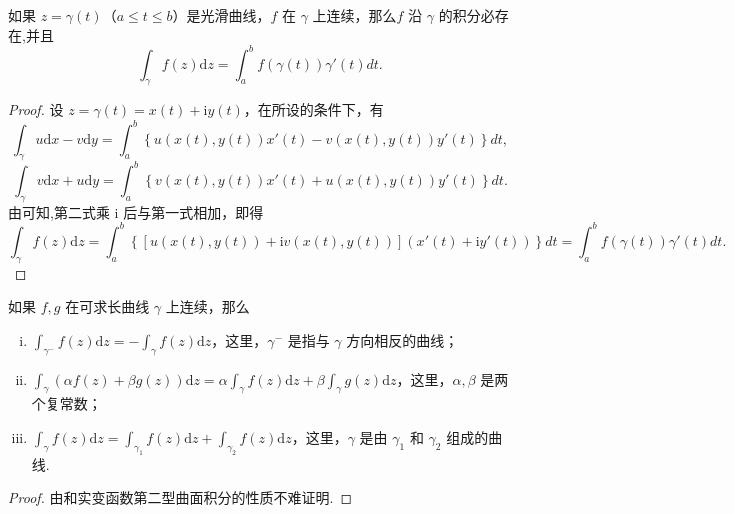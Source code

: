\documentclass[../../main.tex]{subfiles}
\begin{document}
\begin{proposition}\label{proposition:复变函数积分参数方程形式}
如果 \( z = \gamma(t) \)（\( a \leqslant t \leqslant b \)）是光滑曲线，\( f \) 在 \( \gamma \) 上连续，那么\( f \) 沿 \( \gamma \) 的积分必存在,并且
\[
\int_\gamma f(z)\mathrm{d}z = \int_a^b f(\gamma(t))\gamma'(t)dt.
\]
\end{proposition}
\begin{proof}
设 \( z = \gamma(t) = x(t) + \mathrm{i}y(t) \)，在所设的条件下，有
\[
\int_\gamma u \mathrm{d}x - v \mathrm{d}y
= \int_a^b \left\{ u(x(t), y(t))x'(t) - v(x(t), y(t))y'(t) \right\} dt,
\]
\[
\int_\gamma v \mathrm{d}x + u \mathrm{d}y
= \int_a^b \left\{ v(x(t), y(t))x'(t) + u(x(t), y(t))y'(t) \right\} dt.
\]
由可知,第二式乘 \( \mathrm{i} \) 后与第一式相加，即得
\[
\int_\gamma f(z)\mathrm{d}z
= \int_a^b \left\{ [u(x(t), y(t)) + \mathrm{i}v(x(t), y(t))](x'(t) + \mathrm{i}y'(t)) \right\} dt
= \int_a^b f(\gamma(t))\gamma'(t)dt.
\]
\end{proof}

\begin{proposition}
如果 \( f, g \) 在可求长曲线 \( \gamma \) 上连续，那么
\begin{enumerate}[(i)]
\item \( \int_{\gamma^-} f(z)\mathrm{d}z = -\int_\gamma f(z)\mathrm{d}z \)，这里，\( \gamma^- \) 是指与 \( \gamma \) 方向相反的曲线；

\item \( \int_\gamma (\alpha f(z) + \beta g(z))\mathrm{d}z = \alpha \int_\gamma f(z)\mathrm{d}z + \beta \int_\gamma g(z)\mathrm{d}z \)，这里，\( \alpha, \beta \) 是两个复常数；

\item \( \int_\gamma f(z)\mathrm{d}z = \int_{\gamma_1} f(z)\mathrm{d}z + \int_{\gamma_2} f(z)\mathrm{d}z \)，这里，\( \gamma \) 是由 \( \gamma_1 \) 和 \( \gamma_2 \) 组成的曲线.
\end{enumerate}
\end{proposition}
\begin{proof}
由和实变函数第二型曲面积分的性质不难证明.
\end{proof}
\end{document}
